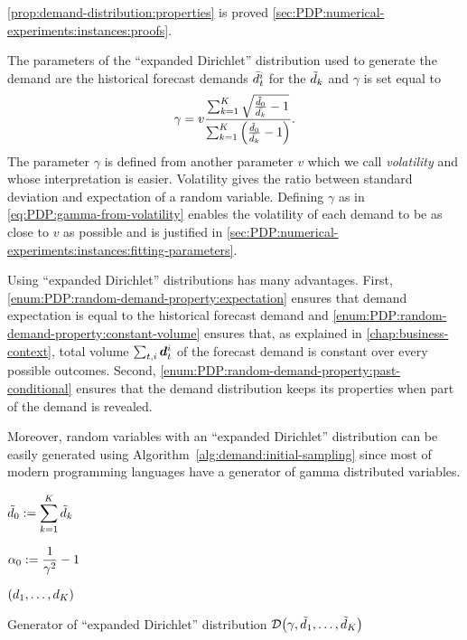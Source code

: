 \cref{prop:demand-distribution:properties} is proved \cref{sec:PDP:numerical-experiments:instances:proofs}.


The parameters of the ``expanded Dirichlet'' distribution used to generate the demand are the historical forecast demands $\bar{d}_t^i$ for the $\tilde{d}_k$ and $\gamma$ is set equal to
\begin{equation}\label{eq:PDP:gamma-from-volatility}
  \gamma
  =
  v\frac
  {\sum_{k=1}^K\sqrt{\frac{\tilde{\demand}_0}{\bar{\demand_k}}-1}}
  {\sum_{k=1}^K\bracket{\frac{\tilde{\demand}_0}{\bar{\demand_k}}-1}}.
\end{equation}
The parameter $\gamma$ is defined from another parameter $v$ which we call \emph{volatility} and whose interpretation is easier.
Volatility gives the ratio between standard deviation and expectation of a random variable.
Defining $\gamma$ as in \cref{eq:PDP:gamma-from-volatility} enables the volatility of each demand to be as close to $v$ as possible and is justified in \cref{sec:PDP:numerical-experiments:instances:fitting-parameters}.


Using ``expanded Dirichlet'' distributions has many advantages.
First, \cref{enum:PDP:random-demand-property:expectation} ensures that demand expectation is equal to the historical forecast demand and \cref{enum:PDP:random-demand-property:constant-volume} ensures that, as explained in \cref{chap:business-context}, total volume $\sum_{t,i}\va\demand_t^i$ of the forecast demand is constant over every possible outcomes.
Second, \cref{enum:PDP:random-demand-property:past-conditional} ensures that the demand distribution keeps its properties when part of the demand is revealed.


Moreover, random variables with an ``expanded Dirichlet'' distribution can be easily generated using Algorithm~\ref{alg:demand:initial-sampling} since most of modern programming languages have a generator of gamma distributed variables.


\begin{algorithm}[H]

\BlankLine

$\displaystyle\tilde{d}_0:= \sum_{k=1}^K\tilde{d}_k$\;

$\displaystyle\alpha_0:= \frac{1}{\gamma^2}-1$\;




\BlankLine

\Return $\bracket{\demand_1,\ldots,\demand_K}$\;

\BlankLine
\caption{Generator of ``expanded Dirichlet'' distribution $\cD\bracket{\gamma,\tilde{\demand}_1,\ldots,\tilde{\demand}_K}$}
\label{alg:demand:initial-sampling}
\end{algorithm}


